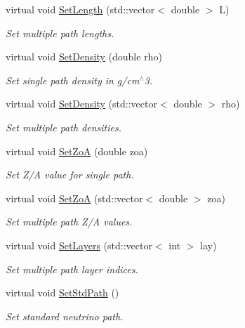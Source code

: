\begin{DoxyCompactItemize}
virtual void \hyperlink{classOscProb_1_1PMNS__Base_aa34a40a3b5abda0f252982d9ead3b520}{Set\+Length} (std\+::vector$<$ double $>$ L)
\begin{DoxyCompactList}\small\item\em Set multiple path lengths. \end{DoxyCompactList}\item 
virtual void \hyperlink{classOscProb_1_1PMNS__Base_ac74206f349687da141392c81e2ba6b0d}{Set\+Density} (double rho)
\begin{DoxyCompactList}\small\item\em Set single path density in g/cm$^\wedge$3. \end{DoxyCompactList}\item 
virtual void \hyperlink{classOscProb_1_1PMNS__Base_a858221d5510fe732dc6a101fd305cda0}{Set\+Density} (std\+::vector$<$ double $>$ rho)
\begin{DoxyCompactList}\small\item\em Set multiple path densities. \end{DoxyCompactList}\item 
virtual void \hyperlink{classOscProb_1_1PMNS__Base_a1bf3ea8fd2507fd2fd82d7410ff8f578}{Set\+ZoA} (double zoa)
\begin{DoxyCompactList}\small\item\em Set Z/A value for single path. \end{DoxyCompactList}\item 
virtual void \hyperlink{classOscProb_1_1PMNS__Base_a8495f8a320e1a21965e6a64aec92ad2a}{Set\+ZoA} (std\+::vector$<$ double $>$ zoa)
\begin{DoxyCompactList}\small\item\em Set multiple path Z/A values. \end{DoxyCompactList}\item 
virtual void \hyperlink{classOscProb_1_1PMNS__Base_a904e580edf89fb98bf9a6397739b4ebe}{Set\+Layers} (std\+::vector$<$ int $>$ lay)
\begin{DoxyCompactList}\small\item\em Set multiple path layer indices. \end{DoxyCompactList}\item 
virtual void \hyperlink{classOscProb_1_1PMNS__Base_add6533a9fc9acdfc7ae258b62570d78d}{Set\+Std\+Path} ()
\begin{DoxyCompactList}\small\item\em Set standard neutrino path. \end{DoxyCompactList}\item 

\end{DoxyCompactItemize}
